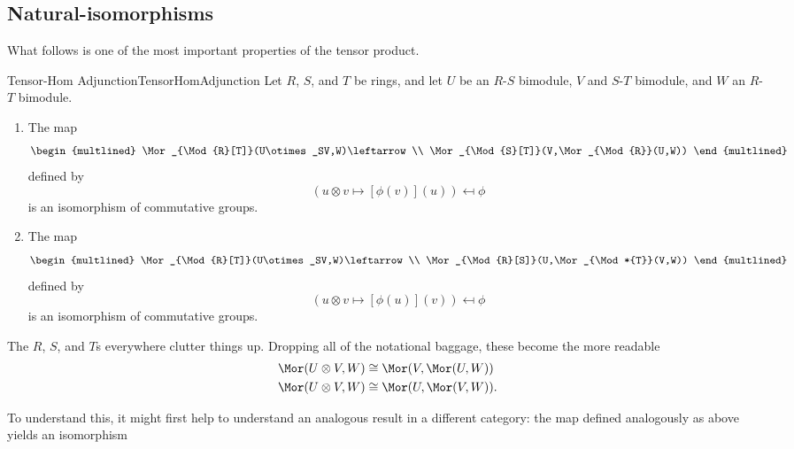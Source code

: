 \subsection{Natural-isomorphisms}

What follows is one of the most important properties of the tensor product.
\begin{thm}{Tensor-Hom Adjunction}{TensorHomAdjunction}
	Let $R$, $S$, and $T$ be rings, and let $U$ be an $R$-$S$ bimodule, $V$ and $S$-$T$ bimodule, and $W$ an $R$-$T$ bimodule.
	\begin{enumerate}
		\item \label{TensorHomAdjunction(i)}The map
		\begin{equation}\label{eqn5.3.7}
			\begin{multlined}
				\Mor _{\Mod{R}[T]}(U\otimes _SV,W)\leftarrow \\ \Mor _{\Mod{S}[T]}(V,\Mor _{\Mod{R}}(U,W))
			\end{multlined}
		\end{equation}
		defined by
		\begin{equation}\label{eqn5.3.8}
			(u\otimes v\mapsto [\phi (v)](u))\mapsfrom \phi
		\end{equation}
		is an isomorphism of commutative groups.
		\item \label{TensorHomAdjunction(ii)}The map
		\begin{equation}\label{eqn5.3.9}
			\begin{multlined}
				\Mor _{\Mod{R}[T]}(U\otimes _SV,W)\leftarrow \\ \Mor _{\Mod{R}[S]}(U,\Mor _{\Mod*{T}}(V,W))
			\end{multlined}
		\end{equation}
		defined by
		\begin{equation}
			(u\otimes v\mapsto [\phi (u)](v))\mapsfrom \phi
		\end{equation}
		is an isomorphism of commutative groups.
	\end{enumerate}
	\begin{rmk}
		The $R$, $S$, and $T$s everywhere clutter things up.  Dropping all of the notational baggage, these become the more readable
		\begin{align*}
			\Mor (U\otimes V,W) & \cong \Mor (V,\Mor (U,W)) \\
			\Mor (U\otimes V,W) & \cong \Mor (U,\Mor (V,W)).
		\end{align*}
	\end{rmk}
	\begin{rmk}
		To understand this, it might first help to understand an analogous result in a different category:  the map defined analogously as above yields an isomorphism

\end{rmk}
\end{thm}
